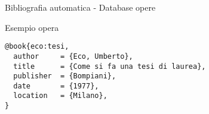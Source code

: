\begin{frame}[fragile]{Bibliografia automatica - Database opere}

\begin{exampleblock}{Esempio opera}
	\begin{lstlisting}
@book{eco:tesi,
  author     = {Eco, Umberto},
  title      = {Come si fa una tesi di laurea},
  publisher  = {Bompiani},
  date       = {1977},
  location   = {Milano},
}
	\end{lstlisting}
\end{exampleblock}

\end{frame}